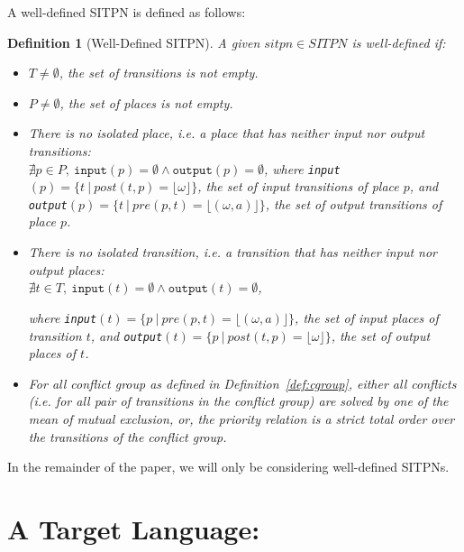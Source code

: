 \documentclass[pdflatex,sn-mathphys]{sn-jnl}%
\theoremstyle{thmstyleone}%
\theoremstyle{thmstyletwo}%
\theoremstyle{thmstylethree}%
\newtheorem{definition}{Definition}%
\begin{document}
\noindent{}A well-defined SITPN is defined as follows:

\begin{definition}[Well-Defined SITPN]\label{def:wd-sitpn}
  A given $sitpn\in{}SITPN$ is well-defined if:
  \begin{itemize}
  \item $T\neq\emptyset$, the set of transitions is not empty.
  \item $P\neq\emptyset$, the set of places is not empty.
  \item There is no isolated place, i.e. a place that has neither
    input nor output transitions:\\
    $\nexists{}p\in{}P,~\mathtt{input}(p)=\emptyset\wedge{}\mathtt{output}(p)=\emptyset$,
    where
    \texttt{input}$(p)=\{t~\vert~post(t,p)=\lfloor\omega\rfloor\}$,
    the set of input transitions of place $p$, and
    \texttt{output}$(p)=\{t~\vert~pre(p,t)=\lfloor(\omega,a)\rfloor\}$,
    the set of output transitions of place $p$.
    
  \item There is no isolated transition, i.e. a transition that has
    neither
    input nor output places:\\
    $\nexists{}t\in{}T,~\mathtt{input}(t)=\emptyset\wedge{}\mathtt{output}(t)=\emptyset$,

    where
    \texttt{input}$(t)=\{p~\vert~pre(p,t)=\lfloor(\omega,a)\rfloor\}$,
    the set of input places of transition $t$, and
    \texttt{output}$(t)=\{p~\vert~post(t,p)=\lfloor\omega\rfloor\}$,
    the set of output places of $t$.
    
  \item For all conflict group as defined in
    Definition~\ref{def:cgroup}, either all conflicts (i.e. for all
    pair of transitions in the conflict group) are solved by one of
    the mean of mutual exclusion, or, the priority relation is a
    \emph{strict total} order over the transitions of the conflict group.
  \end{itemize}
\end{definition}

In the remainder of the paper, we will only be considering
well-defined SITPNs.

\section{A Target Language: \hvhdl{}}
\label{sec:hvhdl}
\end{document}
